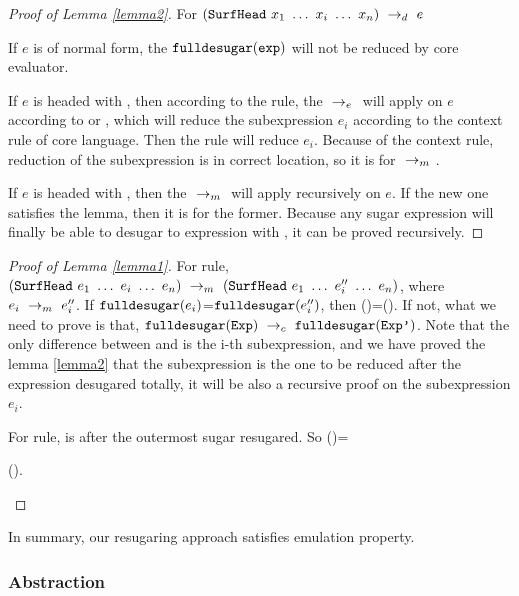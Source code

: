 \begin{proof}[Proof of Lemma \ref{lemma2}]
For $(\mbox{\tt SurfHead}~x_1~\ldots~x_i~\ldots~x_n) ~\rightarrow_d~ e$

If $e$ is of normal form, the $\mbox{\tt fulldesugar}(\mbox{\tt exp})$ will not be reduced by core evaluator.

If $e$ is headed with , then according to the  rule, the $~\rightarrow_e~$ will apply on $e$ according to  or , which will reduce the subexpression $e_i$ according to the context rule of core language. Then the  rule will reduce $e_i$. Because of the context rule, reduction of the subexpression is in correct location, so it is for $~\rightarrow_m~$.

If $e$ is headed with , then the $~\rightarrow_m~$ will apply recursively on $e$. If the new one satisfies the lemma, then it is for the former. Because any sugar expression will finally be able to desugar to expression with , it can be proved recursively.
\end{proof}
\begin{proof}[Proof of Lemma \ref{lemma1}]
\hfill

For  rule, $(\mbox{\tt SurfHead}~e_1~\ldots~e_i~\ldots~e_n) ~\rightarrow_m~(\mbox{\tt SurfHead}~e_1~\ldots~e_i''~\ldots~e_n)$, where $e_i ~\rightarrow_m~e_i''$.
If $\mbox{\tt fulldesugar}(e_i)$=$\mbox{\tt fulldesugar}(e_i'')$, then ()=(). If not,  what we need to prove is that, $\mbox{\tt fulldesugar}(\mbox{\tt Exp}) ~\rightarrow_c~\mbox{\tt fulldesugar}(\mbox{\tt Exp'})$. Note that the only difference between  and  is the i-th subexpression, and we have proved the lemma \ref{lemma2} that the subexpression is the one to be reduced after the expression desugared totally, it will be also a recursive proof on the subexpression $e_i$.

For  rule,  is  after the outermost sugar resugared. So ()=

\begin{flushleft}
().
\end{flushleft}

\end{proof}

In summary, our resugaring approach satisfies emulation property.

\subsubsection{Abstraction}
\label{mark:abs}

